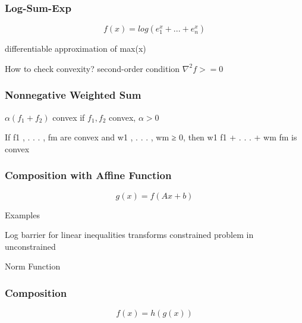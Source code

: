 \subsubsection{Log-Sum-Exp}

$$f(x) = log(e^x_1+...+e^x_n)$$

differentiable approximation of max(x)

How to check convexity?
\rightarrow second-order condition $\nabla^2f >= 0$

\subsubsection{Nonnegative Weighted Sum}

$\alpha(f_1 + f_2)$ convex if $f_1, f_2$ convex, $\alpha > 0$

\rightarrow
If f1 , . . . , fm are convex and w1 , . . . , wm ≥ 0, then w1 f1 + . . . + wm fm is convex

\subsubsection{Composition with Affine Function }

$$g(x) =f(Ax+b) $$

Examples

Log barrier for linear inequalities
\rightarrow transforms constrained problem in unconstrained

Norm Function

\subsubsection{Composition}

$$f(x)=h(g(x))$$
